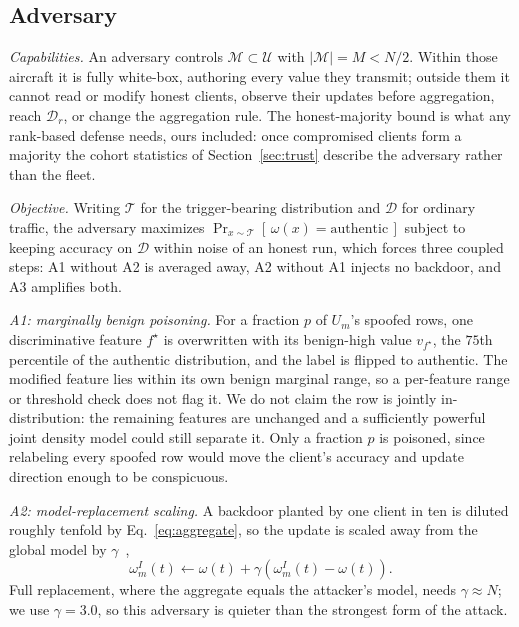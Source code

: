 \documentclass[conference]{IEEEtran}
\begin{document}
\subsection{Adversary}

\emph{Capabilities.} An adversary controls $\mathcal{M}\subset\mathcal{U}$ with
$|\mathcal{M}|=M<N/2$. Within those aircraft it is fully white-box, authoring
every value they transmit; outside them it cannot read or modify honest
clients, observe their updates before aggregation, reach $\mathcal{D}_r$, or
change the aggregation rule. The honest-majority bound is what any rank-based
defense needs, ours included: once compromised clients form a majority the
cohort statistics of Section~\ref{sec:trust} describe the adversary rather than
the fleet.

\emph{Objective.} Writing $\mathcal{T}$ for the trigger-bearing distribution and
$\mathcal{D}$ for ordinary traffic, the adversary maximizes
$\Pr_{x\sim\mathcal{T}}[\,\omega(x)=\text{authentic}\,]$ subject to keeping
accuracy on $\mathcal{D}$ within noise of an honest run, which forces three
coupled steps: A1 without A2 is averaged away, A2 without A1 injects no
backdoor, and A3 amplifies both.

\emph{A1: marginally benign poisoning.} For a fraction $p$ of $U_m$'s spoofed
rows, one discriminative feature $f^\star$ is overwritten with its benign-high
value $v_{f^\star}$, the $75$th percentile of the authentic distribution, and
the label is flipped to authentic. The modified feature lies within its own
benign marginal range, so a per-feature range or threshold check does not flag
it. We do not claim the row is jointly in-distribution: the remaining features
are unchanged and a sufficiently powerful joint density model could still
separate it. Only a fraction $p$ is poisoned, since relabeling every spoofed
row would move the client's accuracy and update direction enough to be
conspicuous.

\emph{A2: model-replacement scaling.} A backdoor planted by one client in ten
is diluted roughly tenfold by Eq.~\eqref{eq:aggregate}, so the update is scaled
away from the global model by $\gamma$~\cite{bagdasaryan2020backdoor},
\begin{equation}
\omega_m^{I}(t)\leftarrow\omega(t)+\gamma\left(\omega_m^{I}(t)-\omega(t)\right).
\label{eq:boost}
\end{equation}
Full replacement, where the aggregate equals the attacker's model, needs
$\gamma\approx N$; we use $\gamma=3.0$, so this adversary is quieter than the
strongest form of the attack.
\end{document}

